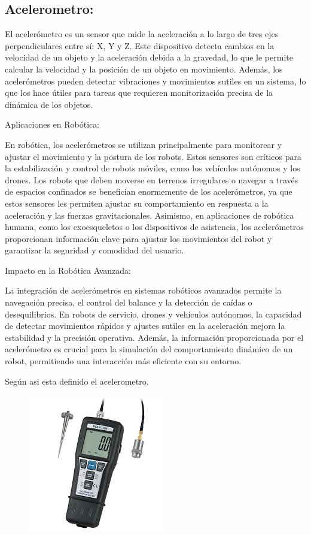 \subsection{\textbf{Acelerometro}:}

El acelerómetro es un sensor que mide la aceleración a lo largo de tres ejes perpendiculares entre sí: X, Y y Z. Este dispositivo detecta cambios en la velocidad de un objeto y la aceleración debida a la gravedad, lo que le permite calcular la velocidad y la posición de un objeto en movimiento. Además, los acelerómetros pueden detectar vibraciones y movimientos sutiles en un sistema, lo que los hace útiles para tareas que requieren monitorización precisa de la dinámica de los objetos.


Aplicaciones en Robótica:


En robótica, los acelerómetros se utilizan principalmente para monitorear y ajustar el movimiento y la postura de los robots. Estos sensores son críticos para la estabilización y control de robots móviles, como los vehículos autónomos y los drones. Los robots que deben moverse en terrenos irregulares o navegar a través de espacios confinados se benefician enormemente de los acelerómetros, ya que estos sensores les permiten ajustar su comportamiento en respuesta a la aceleración y las fuerzas gravitacionales. Asimismo, en aplicaciones de robótica humana, como los exoesqueletos o los dispositivos de asistencia, los acelerómetros proporcionan información clave para ajustar los movimientos del robot y garantizar la seguridad y comodidad del usuario.


Impacto en la Robótica Avanzada:


La integración de acelerómetros en sistemas robóticos avanzados permite la navegación precisa, el control del balance y la detección de caídas o desequilibrios. En robots de servicio, drones y vehículos autónomos, la capacidad de detectar movimientos rápidos y ajustes sutiles en la aceleración mejora la estabilidad y la precisión operativa. Además, la información proporcionada por el acelerómetro es crucial para la simulación del comportamiento dinámico de un robot, permitiendo una interacción más eficiente con su entorno.

Según \cite{kuo2017automatic} asi esta definido el acelerometro.

\begin{figure} [h]
	\centering
	\includegraphics[width=0.3\linewidth]{img/acelerometro}
	\caption{}
	\label{fig:acelerometro}
\end{figure}
